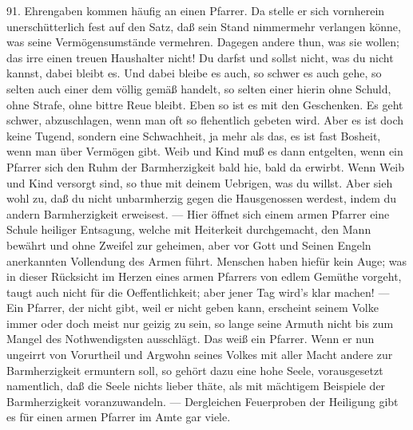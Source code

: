 91. Ehrengaben kommen häufig an einen Pfarrer. Da stelle er sich vornherein unerschütterlich fest auf den Satz, daß sein Stand nimmermehr verlangen könne, was seine Vermögensumstände vermehren. Dagegen andere thun, was sie wollen; das irre einen treuen Haushalter nicht! Du darfst und sollst nicht, was du nicht kannst, dabei bleibt es. Und dabei bleibe es auch, so schwer es auch gehe, so selten auch einer dem völlig gemäß handelt, so selten einer hierin ohne Schuld, ohne Strafe, ohne bittre Reue bleibt. Eben so ist es mit den Geschenken. Es geht schwer, abzuschlagen, wenn man oft so flehentlich gebeten wird. Aber es ist doch keine Tugend, sondern eine Schwachheit, ja mehr als das, es ist fast Bosheit, wenn man über Vermögen gibt. Weib und Kind muß es dann entgelten, wenn ein Pfarrer sich den Ruhm der Barmherzigkeit bald hie, bald da erwirbt. Wenn Weib und Kind versorgt sind, so thue mit deinem Uebrigen, was
du willst. Aber sieh wohl zu, daß du nicht unbarmherzig gegen die Hausgenossen werdest, indem du andern Barmherzigkeit erweisest. — Hier öffnet sich einem armen Pfarrer eine Schule heiliger Entsagung, welche mit Heiterkeit durchgemacht, den Mann bewährt und ohne Zweifel zur geheimen, aber vor Gott und Seinen Engeln anerkannten Vollendung des Armen führt. Menschen haben hiefür kein Auge; was in dieser Rücksicht im Herzen eines armen Pfarrers von edlem Gemüthe vorgeht, taugt auch nicht für die Oeffentlichkeit; aber jener Tag wird’s klar machen! — Ein Pfarrer, der nicht gibt, weil er nicht geben kann, erscheint seinem Volke immer oder doch meist nur geizig zu sein, so lange seine Armuth nicht bis zum Mangel des Nothwendigsten ausschlägt. Das weiß ein Pfarrer. Wenn er nun ungeirrt von Vorurtheil und Argwohn seines Volkes mit aller Macht andere zur Barmherzigkeit ermuntern soll, so gehört dazu eine hohe Seele, vorausgesetzt namentlich, daß die Seele nichts lieber thäte, als mit mächtigem Beispiele der Barmherzigkeit voranzuwandeln. — Dergleichen Feuerproben der Heiligung gibt es für einen armen Pfarrer im Amte gar viele.

